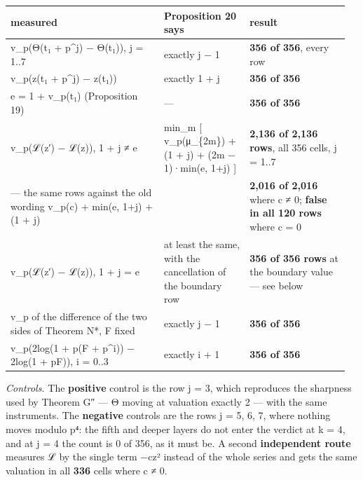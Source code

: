 \documentclass[11pt,a4paper]{article}
\theoremstyle{named}
\begin{document}
\begin{center}\begin{small}
\begin{tabular}{>{\raggedright\arraybackslash}p{0.432\linewidth}>{\raggedright\arraybackslash}p{0.241\linewidth}>{\raggedright\arraybackslash}p{0.285\linewidth}}
\hline
measured & Proposition 20 says & result \\
\hline
v\_p(Θ(t₁ + p\textasciicircum{}j) − Θ(t₁)), j = 1..7 & exactly j − 1 & \textbf{356 of 356}, every row \\
v\_p(z(t₁ + p\textasciicircum{}j) − z(t₁)) & exactly 1 + j & \textbf{356 of 356} \\
e = 1 + v\_p(t₁) (Proposition 19) & — & \textbf{356 of 356} \\
v\_p(ℒ(z′) − ℒ(z)), 1 + j ≠ e & min\_m [ v\_p(μ\_\{2m\}) + (1 + j) + (2m − 1)·min(e, 1+j) ] & \textbf{2,136 of 2,136 rows}, all 356 cells, j = 1..7 \\
— the same rows against the old wording v\_p(c) + min(e, 1+j) + (1 + j) &  & \textbf{2,016 of 2,016} where c ≠ 0; \textbf{false in all 120 rows} where c = 0 \\
v\_p(ℒ(z′) − ℒ(z)), 1 + j = e & at least the same, with the cancellation of the boundary row & \textbf{356 of 356 rows} at the boundary value — see below \\
v\_p of the difference of the two sides of Theorem N*, F fixed & exactly j − 1 & \textbf{356 of 356} \\
v\_p(2log(1 + p(F + p\textasciicircum{}i)) − 2log(1 + pF)), i = 0..3 & exactly i + 1 & \textbf{356 of 356} \\
\hline
\end{tabular}
\end{small}\end{center}

\textit{Controls.} The \textbf{positive} control is the row j = 3, which reproduces the sharpness used by Theorem G″ — Θ moving at valuation exactly 2 — with the same instruments. The \textbf{negative} controls are the rows j = 5, 6, 7, where nothing moves modulo p⁴: the fifth and deeper layers do not enter the verdict at k = 4, and at j = 4 the count is 0 of 356, as it must be. A second \textbf{independent route} measures ℒ by the single term −cz² instead of the whole series and gets the same valuation in all \textbf{336} cells where c ≠ 0.
\end{document}
